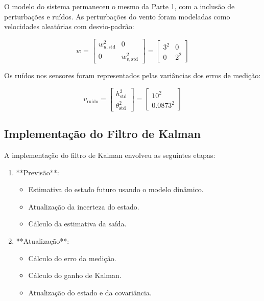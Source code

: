 \documentclass[a4paper, 12pt]{article}
\begin{document}
O modelo do sistema permaneceu o mesmo da Parte 1, com a inclusão de perturbações e ruídos. As perturbações do vento foram modeladas como velocidades aleatórias com desvio-padrão:

\[
w = \begin{bmatrix}
w_{u,\text{std}}^2 & 0 \\
0 & w_{v,\text{std}}^2
\end{bmatrix}
= \begin{bmatrix}
3^2 & 0 \\
0 & 2^2
\end{bmatrix}
\]

Os ruídos nos sensores foram representados pelas variâncias dos erros de medição:

\[
v_{\text{ruído}} = \begin{bmatrix}
h_{\text{std}}^2 \\
\theta_{\text{std}}^2
\end{bmatrix}
= \begin{bmatrix}
10^2 \\
0.0873^2
\end{bmatrix}
\]

\subsection{Implementação do Filtro de Kalman}

A implementação do filtro de Kalman envolveu as seguintes etapas:

\begin{enumerate}
    \item **Previsão**:
    \begin{itemize}
        \item Estimativa do estado futuro usando o modelo dinâmico.
        \item Atualização da incerteza do estado.
        \item Cálculo da estimativa da saída.
    \end{itemize}
    \item **Atualização**:
    \begin{itemize}
        \item Cálculo do erro da medição.
        \item Cálculo do ganho de Kalman.
        \item Atualização do estado e da covariância.
    \end{itemize}
\end{enumerate}
\end{document}
